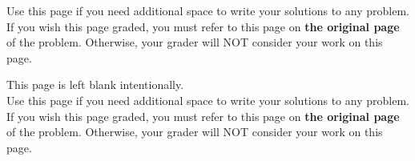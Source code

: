 \documentclass[11pt]{article}
\begin{document}
\begin{enumerate}
Use this page if you need additional space to write your solutions to any problem. \\

If you wish this page graded, you must refer to this page on \textbf{the original page} of the problem. Otherwise, your grader will NOT consider your work on this page.

\newpage

This page is left blank intentionally.\\

Use this page if you need additional space to write your solutions to any problem. \\

If you wish this page graded, you must refer to this page on \textbf{the original page} of the problem. Otherwise, your grader will NOT consider your work on this page.


\end{enumerate}
\end{document}

